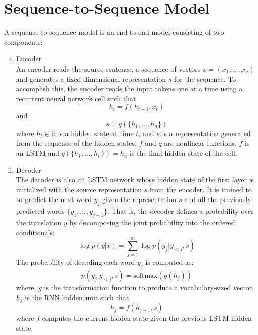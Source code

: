 \section{Sequence-to-Sequence Model}
A sequence-to-sequence model is an end-to-end model consisting of two components:
\begin{enumerate}[i.]
\item Encoder
\\
An encoder reads the source sentence, a sequence of vectors $x = (x_1, \ldots, x_n)$ and  generates a fixed-dimensional representation $s$ for the sequence. To accomplish this, the encoder reads the input tokens one at a time using a recurrent neural network cell such that
\begin{equation}
\label{eq:1.1}
h_t = f(h_{t-1}, x_t)
\end{equation}
and
\begin{equation}
\label{eq:1.2}
s = q(\{h_1, \ldots, h_n\})
\end{equation}
where 
$h_t \in \mathbb {R}$ is a hidden state at time $t$, and $s$ is a representation generated from the sequence of the hidden states. $f$ and $q$ are nonlinear functions. $f$ is an LSTM and $q(\{h_1, \ldots, h_n\}) = h_n$ is the final hidden state of the cell.

\item Decoder
\\
The decoder is also an LSTM network whose hidden state of the first layer is initialized with the source representation $s$ from the encoder. It is trained to to predict the next word $y_j$ given the representation $s$ and all the previously predicted words $\{y_1, \ldots, y_{j−1}\}$. That is, the decoder defines a probability over the translation $y$ by decomposing the joint probability into the ordered conditionals:
\begin{equation}
\label{eq:1.3}
\log p(y|x) = \sum_{j=1}^{m} \log p(y_j|y_{<j}, s)
\end{equation}
The probability of decoding each word $y_j$ is computed as:
\begin{equation}
\label{eq:1.4}
p(y_j|y_{<j}, s) = \text{softmax}(g(h_j))
\end{equation}
where, $g$ is the transformation function to produce a vocabulary-sized vector, $h_j$ is the RNN hidden unit such that
\begin{equation}
\label{eq:1.5}
h_j = f(h_{j-1}, s)
\end{equation}
where $f$ computes the current hidden state given the previous LSTM hidden state.
\end{enumerate}

